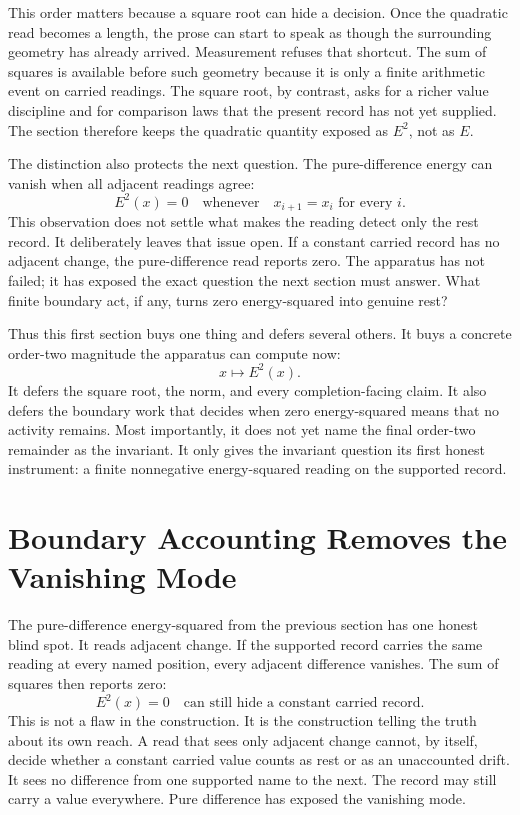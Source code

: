 This order matters because a square root can hide a decision. Once the
quadratic read becomes a length, the prose can start to speak as though the
surrounding geometry has already arrived. Measurement refuses that shortcut.
The sum of squares is available before such geometry because it is only a
finite arithmetic event on carried readings. The square root, by contrast,
asks for a richer value discipline and for comparison laws that the present
record has not yet supplied. The section therefore keeps the quadratic
quantity exposed as \(E^2\), not as \(E\).

The distinction also protects the next question. The pure-difference energy
can vanish when all adjacent readings agree:
\[
  E^2(x)=0
  \quad\text{whenever}\quad
  x_{i+1}=x_i \text{ for every } i .
\]
This observation does not settle what makes the reading detect only the
rest record. It deliberately leaves that issue open. If a constant carried
record has no adjacent change, the pure-difference read reports zero. The
apparatus has not failed; it has exposed the exact question the next section
must answer. What finite boundary act, if any, turns zero energy-squared into
genuine rest?

Thus this first section buys one thing and defers several others. It buys a concrete
order-two magnitude the apparatus can compute now:
\[
  x \longmapsto E^2(x).
\]
It defers the square root, the norm, and every completion-facing claim. It
also defers the boundary work that decides when zero energy-squared means
that no activity remains. Most importantly, it does not yet name the final
order-two remainder as the invariant. It only gives the invariant question
its first honest instrument: a finite nonnegative energy-squared reading on
the supported record.

\section[Boundary Accounting]{Boundary Accounting Removes the Vanishing Mode}

The pure-difference energy-squared from the previous section has one honest
blind spot. It reads adjacent change. If the supported record carries the same
reading at every named position, every adjacent difference vanishes. The sum of
squares then reports zero:
\[
  E^2(x)=0
  \quad\text{can still hide a constant carried record.}
\]
This is not a flaw in the construction. It is the construction telling the
truth about its own reach. A read that sees only adjacent change cannot, by
itself, decide whether a constant carried value counts as rest or as an
unaccounted drift. It sees no difference from one supported name to the next.
The record may still carry a value everywhere. Pure difference has exposed the
vanishing mode.

